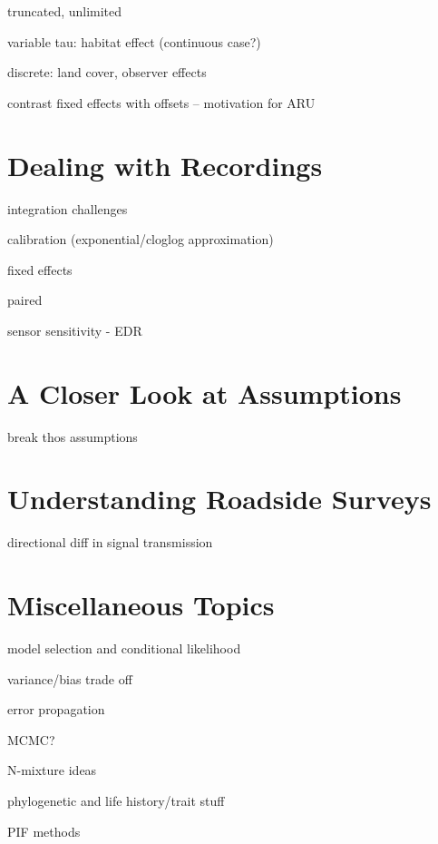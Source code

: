 \documentclass[12pt,]{book}
\begin{document}
truncated, unlimited

variable tau: habitat effect (continuous case?)

discrete: land cover, observer effects

contrast fixed effects with offsets -- motivation for ARU

\hypertarget{recordings}{%
\chapter{Dealing with Recordings}\label{recordings}}

integration challenges

calibration (exponential/cloglog approximation)

fixed effects

paired

sensor sensitivity - EDR

\hypertarget{assumptions}{%
\chapter{A Closer Look at Assumptions}\label{assumptions}}

break thos assumptions

\hypertarget{roadsides}{%
\chapter{Understanding Roadside Surveys}\label{roadsides}}

directional diff in signal transmission

\hypertarget{extras}{%
\chapter{Miscellaneous Topics}\label{extras}}

model selection and conditional likelihood

variance/bias trade off

error propagation

MCMC?

N-mixture ideas

phylogenetic and life history/trait stuff

PIF methods


\end{document}
